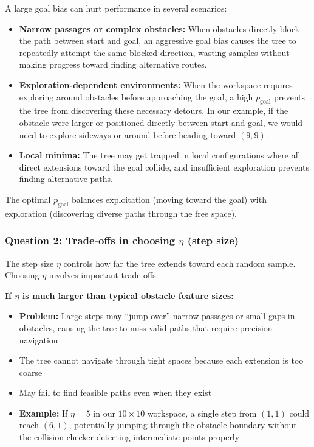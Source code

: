 \documentclass[11pt]{article}
\begin{document}
A large goal bias can hurt performance in several scenarios:
\begin{itemize}
    \item \textbf{Narrow passages or complex obstacles:} When obstacles directly block the path between start and goal, an aggressive goal bias causes the tree to repeatedly attempt the same blocked direction, wasting samples without making progress toward finding alternative routes.
    
    \item \textbf{Exploration-dependent environments:} When the workspace requires exploring around obstacles before approaching the goal, a high $p_{\text{goal}}$ prevents the tree from discovering these necessary detours. In our example, if the obstacle were larger or positioned directly between start and goal, we would need to explore sideways or around before heading toward $(9,9)$.
    
    \item \textbf{Local minima:} The tree may get trapped in local configurations where all direct extensions toward the goal collide, and insufficient exploration prevents finding alternative paths.
\end{itemize}

The optimal $p_{\text{goal}}$ balances exploitation (moving toward the goal) with exploration (discovering diverse paths through the free space).

\subsubsection{Question 2: Trade-offs in choosing $\eta$ (step size)}

The step size $\eta$ controls how far the tree extends toward each random sample. Choosing $\eta$ involves important trade-offs:

\textbf{If $\eta$ is much larger than typical obstacle feature sizes:}
\begin{itemize}
    \item \textbf{Problem:} Large steps may ``jump over'' narrow passages or small gaps in obstacles, causing the tree to miss valid paths that require precision navigation
    \item The tree cannot navigate through tight spaces because each extension is too coarse
    \item May fail to find feasible paths even when they exist
    \item \textbf{Example:} If $\eta = 5$ in our $10 \times 10$ workspace, a single step from $(1,1)$ could reach $(6,1)$, potentially jumping through the obstacle boundary without the collision checker detecting intermediate points properly
\end{itemize}
\end{document}
